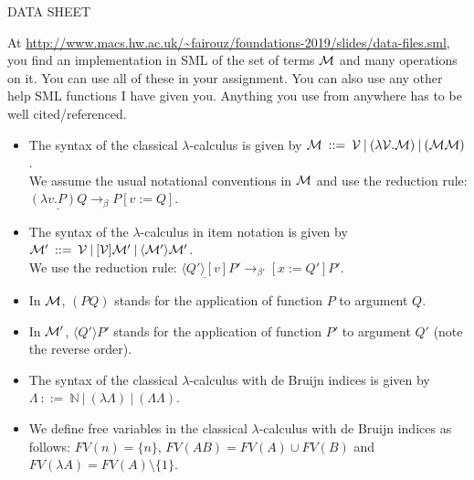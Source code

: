\documentclass[11pt]{article}
\newcommand{\la}{\lambda}
\newcommand{\be}{\beta}
\newcommand \cM {\cal M}
\begin{document}
\begin{center}
	\Huge{DATA SHEET}
\end{center}


At \url{http://www.macs.hw.ac.uk/~fairouz/foundations-2019/slides/data-files.sml}, you find an implementation in SML of the set of
terms $\cM$ and many operations on it.  You can use all of these in your assignment.  You can also use any other help SML functions I have given you.  Anything you use from anywhere has to be well cited/referenced.

\begin{itemize}
	\item
	      The syntax of the classical $\lambda$-calculus is given by
	      $\cM  \: ::=  \:  {\cal V} \:|\: ( \la{{\cal V}}.{\cM}) \:|\: ( \cM \cM)$.\\
	      We assume the usual notational conventions in $\cM$ and use 
	      the reduction rule: \\$\underline{(\la v. P)Q} \rightarrow_\be P[v:=Q]$.
	\item
	      The syntax of the  $\lambda$-calculus in item notation is given by
	      $\cM'  \: ::=  \:  {\cal V} \:|\: [{\cal V}]\cM' \:|\: \langle\cM'\rangle\cM'$.\\
	      We use the reduction rule: 
	      $ \underline{\langle Q'\rangle[v]}P' \rightarrow_{\be'} [x:=Q']P'$.
	\item
	      In $\cM$, $(PQ)$ stands for the application of function $P$ to argument $Q$.
	\item
	      In $\cM'$, $\langle Q'\rangle P'$ stands for the application of function $P'$ to argument $Q'$ (note the reverse order).
	\item
	      The syntax of the classical $\lambda$-calculus with de Bruijn indices is given by\\
	      $\Lambda  \: ::=  \:  {\mathbb{N}} \:|\: ( \la{}{\Lambda}) \:|\: ( \Lambda \Lambda)$.
	\item
	      We define free variables in 
	      the classical $\lambda$-calculus with de Bruijn indices as follows:
	      $FV(n) = \{n\}$, $FV(AB) = FV(A)\cup FV(B)$ and $FV(\lambda A) = FV(A)\setminus\{1\}$.

\end{itemize}
\end{document}
